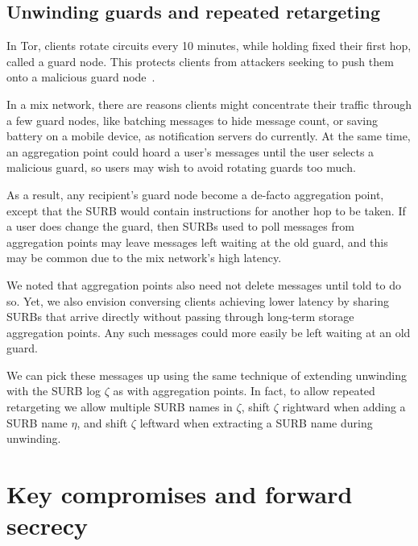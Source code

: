 \documentclass[twoside,letterpaper]{llncs}
\begin{document}
\subsection{Unwinding guards and repeated retargeting}

In Tor, clients rotate circuits every 10 minutes, while holding
fixed their first hop, called a guard node.  This protects clients
from attackers seeking to push them onto a malicious guard
node~\cite{tor-guards}.

In a mix network, there are reasons clients might concentrate their
traffic through a few guard nodes, like batching messages to hide
message count, or saving battery on a mobile device, as notification
servers do currently.  At the same time, an aggregation point could
hoard a user's messages until the user selects a malicious guard,
so users may wish to avoid rotating guards too much.

As a result, any recipient's guard node become a de-facto aggregation
point, except that the SURB would contain instructions for another hop
to be taken.  If a user does change the guard, then SURBs used to poll
messages from aggregation points may leave messages left waiting at
the old guard, and this may be common due to the mix network's
high latency.

We noted that aggregation points also need not delete messages until
told to do so.  Yet, we also envision conversing clients achieving
lower latency by sharing SURBs that arrive directly without passing
through long-term storage aggregation points.  Any such messages could
more easily be left waiting at an old guard.

We can pick these messages up using the same technique of extending
unwinding with the SURB log $\zeta$ as with aggregation points.  In
fact, to allow repeated retargeting we allow multiple SURB names in
$\zeta$, shift $\zeta$ rightward when adding a SURB name $\eta$, and
shift $\zeta$ leftward when extracting a SURB name during unwinding.



\section{Key compromises and forward secrecy}
\end{document}
